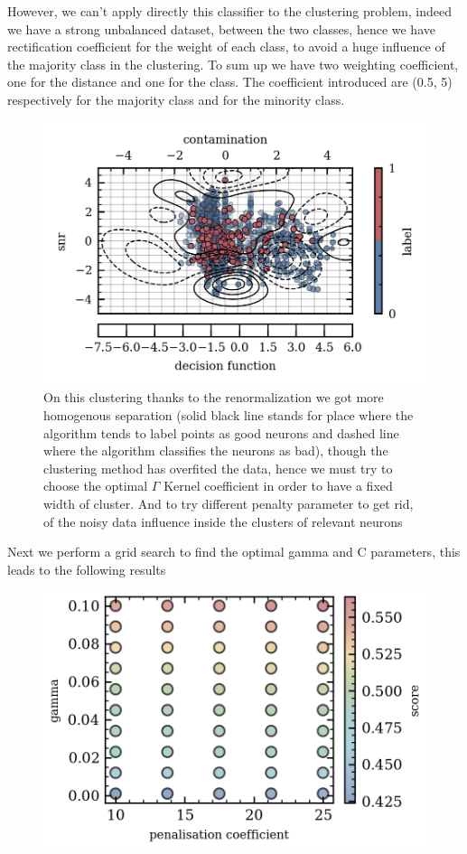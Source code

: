 \documentclass[11pt,a4paper]{report}
\begin{document}
\begin{multicols}{2}
    However, we can't apply directly this classifier to the clustering problem, indeed we have a strong unbalanced dataset, between the two classes, hence we have rectification coefficient for the weight of each class, to avoid a huge influence of the majority class in the clustering.
    To sum up we have two weighting coefficient, one for the distance and one for the class. The coefficient introduced are (0.5, 5) respectively for the majority class and for the minority class.

    \begin{figure}[H]
        \centering
        \includegraphics[width=0.9\linewidth]{figure/decision_function_working_6.png}
        \caption{On this clustering thanks to the renormalization we got more homogenous separation (solid black line stands for place where the algorithm tends to label points as good neurons and dashed line where the algorithm classifies the neurons as bad), though the clustering method has overfited the data, hence we must try to choose the optimal $\Gamma$ Kernel coefficient in order to have a fixed width of cluster. And to try different penalty parameter to get rid,
            of the noisy data influence inside the clusters of relevant neurons}
        \label{}
    \end{figure}
    Next we perform a grid search to find the optimal gamma and C parameters, this leads to the following results
    \begin{figure}[H]
        \centering
        \includegraphics[width=0.9\linewidth]{figure/grid_search.png}

\end{figure}
\end{multicols}
\end{document}
